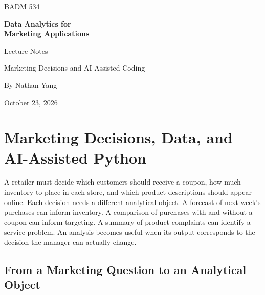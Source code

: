 

\hypersetup{pageanchor=false}
\begin{titlepage}
\color{IlliniBlue}
\vspace*{1.2cm}
{\sffamily\Large BADM 534\par}
\vspace{.7cm}
{\Huge\bfseries Data Analytics for\\[.2cm] Marketing Applications\par}
\vspace{.8cm}
{\LARGE Lecture Notes\par}
\vspace{.5cm}
{\large Marketing Decisions and AI-Assisted Coding\par}
\vspace{1.1cm}
\noindent{\color{IlliniOrange}\rule{\textwidth}{2pt}}\par
\vspace{.7cm}
{\large By Nathan Yang\par}
{\large October 23, 2026\par}
\end{titlepage}
\hypersetup{pageanchor=true}
\tableofcontents
\clearpage
{}
\hypertarget{M01-m1.-marketing-decisions-data-and-ai-assisted-python}{%
\chapter{Marketing Decisions, Data, and AI-Assisted
Python}\label{M01-m1.-marketing-decisions-data-and-ai-assisted-python}}

\noindent A retailer must decide which customers should receive a coupon, how much
inventory to place in each store, and which product descriptions should
appear online. Each decision needs a different analytical object. A
forecast of next week's purchases can inform inventory. A comparison of
purchases with and without a coupon can inform targeting. A summary of
product complaints can identify a service problem. An analysis becomes
useful when its output corresponds to the decision the manager can
actually change.

\hypertarget{M01-from-a-marketing-question-to-an-analytical-object}{%
\section{From a Marketing Question to an Analytical
Object}\label{M01-from-a-marketing-question-to-an-analytical-object}}

